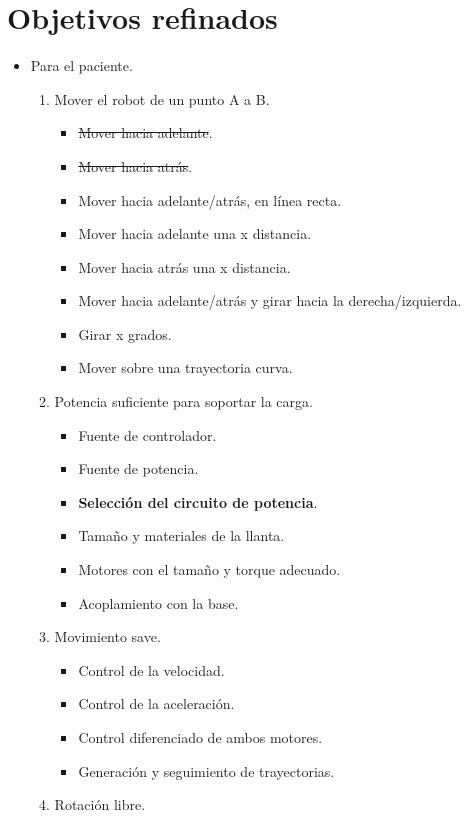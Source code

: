 \section{Objetivos refinados}
\begin{itemize}
	\item Para el paciente.
		\begin{enumerate}
			\item Mover el robot de un punto A a B.
				\begin{itemize}
					\item \st{Mover hacia adelante}.
					\item \st{Mover hacia atr\'as}.
					\item Mover hacia adelante/atrás, en línea
						recta.
					\item Mover hacia adelante una x distancia.
					\item Mover hacia atrás una x distancia.
					\item Mover hacia adelante/atrás y girar hacia
						la derecha/izquierda.
					\item Girar x grados.
					\item Mover sobre una trayectoria curva.
				\end{itemize}
			\item Potencia suficiente para soportar la carga.
				\begin{itemize}
					\item Fuente de controlador.
					\item Fuente de potencia.
					\item \textbf{Selección del circuito de 
						potencia}.
					\item Tamaño y materiales de la llanta.
					\item Motores con el tamaño y torque adecuado.
					\item Acoplamiento con la base.
				\end{itemize}
			\item Movimiento save.
				\begin{itemize}
					\item Control de la velocidad.
					\item Control de la aceleración.
					\item Control diferenciado de ambos motores.
					\item Generación y seguimiento de trayectorias.
				\end{itemize}
			\item Rotación libre.
				\begin{itemize}

\end{itemize}
\end{enumerate}
\end{itemize}
